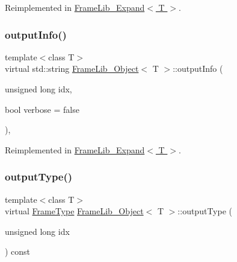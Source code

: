 Reimplemented in \hyperlink{class_frame_lib___expand_ae3cdc7661ba6a00f816e9aaea68ce262}{Frame\+Lib\+\_\+\+Expand$<$ T $>$}.

\mbox{\label{class_frame_lib___object_a6e6d79e8d620eedbaa50abf324cdedf5}} 
\subsubsection{\texorpdfstring{output\+Info()}{outputInfo()}}
{\footnotesize\ttfamily template$<$class T$>$ \\
virtual std\+::string \hyperlink{class_frame_lib___object}{Frame\+Lib\+\_\+\+Object}$<$ T $>$\+::output\+Info (\begin{DoxyParamCaption}\item[{unsigned long}]{idx,  }\item[{bool}]{verbose = {\ttfamily false} }\end{DoxyParamCaption})\hspace{0.3cm}{\ttfamily [inline]}, {\ttfamily [virtual]}}



Reimplemented in \hyperlink{class_frame_lib___expand_a0c7a6f0cc3779c6fb6a61fe8e3a8bc60}{Frame\+Lib\+\_\+\+Expand$<$ T $>$}.

\mbox{\label{class_frame_lib___object_a03eb408844f15d8f73cee67f43149b9d}} 
\subsubsection{\texorpdfstring{output\+Type()}{outputType()}}
{\footnotesize\ttfamily template$<$class T$>$ \\
virtual \hyperlink{_frame_lib___types_8h_ad495a9f61af7fff07d7e97979d1ab854}{Frame\+Type} \hyperlink{class_frame_lib___object}{Frame\+Lib\+\_\+\+Object}$<$ T $>$\+::output\+Type (\begin{DoxyParamCaption}\item[{unsigned long}]{idx }\end{DoxyParamCaption}) const\hspace{0.3cm}{\ttfamily [pure virtual]}}



